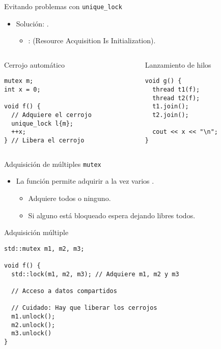 \begin{frame}[t,fragile]{Evitando problemas con \texttt{unique\_lock}}
\begin{itemize}
  \item Solución: .
    \begin{itemize}
      \item {}:  (Resource Acquisition Is Initialization).
    \end{itemize}
\end{itemize}

\begin{columns}[T]
\begin{column}{.5\textwidth}
\begin{block}{Cerrojo automático}
\begin{lstlisting}
mutex m;
int x = 0;

void f() {
  // Adquiere el cerrojo
  unique_lock l{m}; 
  ++x;
} // Libera el cerrojo
\end{lstlisting}
\end{block}
\end{column}

\begin{column}{.5\textwidth}
\begin{block}{Lanzamiento de hilos}
\begin{lstlisting}
void g() {
  thread t1(f); 
  thread t2(f);
  t1.join(); 
  t2.join();

  cout << x << "\n";
}
\end{lstlisting}
\end{block}
\end{column}
\end{columns}
\end{frame}

\begin{frame}[t,fragile]{Adquisición de múltiples \texttt{mutex}}
\begin{itemize}
  \item La función  permite adquirir a la vez varios .
    \begin{itemize}
      \item Adquiere todos o ninguno.
      \item Si alguno está bloqueado espera dejando libres todos.
    \end{itemize}
\end{itemize}

\begin{block}{Adquisición múltiple}
\begin{lstlisting}
std::mutex m1, m2, m3;

void f() {
  std::lock(m1, m2, m3); // Adquiere m1, m2 y m3

  // Acceso a datos compartidos

  // Cuidado: Hay que liberar los cerrojos
  m1.unlock();
  m2.unlock();
  m3.unlock()
} 
\end{lstlisting}
\end{block}
\end{frame}

